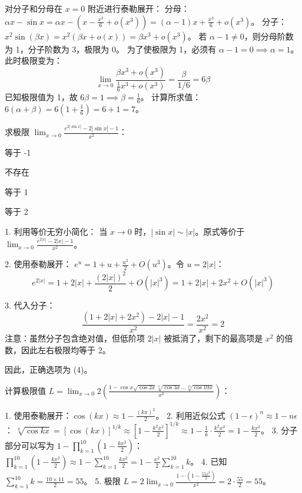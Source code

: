 \begin{questions}
\begin{solution}
对分子和分母在 $x=0$ 附近进行泰勒展开：
分母：$\alpha x - \sin x = \alpha x - (x - \frac{x^3}{6} + o(x^3)) = (\alpha - 1)x + \frac{x^3}{6} + o(x^3)$。
分子：$x^2 \sin(\beta x) = x^2 (\beta x + o(x)) = \beta x^3 + o(x^3)$。
若 $\alpha - 1 \neq 0$，则分母阶数为 1，分子阶数为 3，极限为 0。
为了使极限为 1，必须有 $\alpha - 1 = 0 \implies \alpha = 1$。
此时极限变为：
\[
\lim_{x \to 0} \frac{\beta x^3 + o(x^3)}{\frac{1}{6}x^3 + o(x^3)} = \frac{\beta}{1/6} = 6\beta
\]
已知极限值为 1，故 $6\beta = 1 \implies \beta = \frac{1}{6}$。
计算所求值：$6(\alpha + \beta) = 6(1 + \frac{1}{6}) = 6 + 1 = 7$。
\end{solution}
    \question 
求极限 $\lim_{x \to 0} \frac{e^{2|\sin x|} - 2|\sin x| - 1}{x^2}$：
\begin{choices}
    \item 等于 -1
    \item 不存在
    \item 等于 1
    \item 等于 2
\end{choices}

\begin{solution}
1. 利用等价无穷小简化：
当 $x \to 0$ 时，$|\sin x| \sim |x|$。原式等价于 $\lim_{x \to 0} \frac{e^{2|x|} - 2|x| - 1}{x^2}$。

2. 使用泰勒展开：
$e^u = 1 + u + \frac{u^2}{2} + O(u^3)$。令 $u = 2|x|$：
\[ e^{2|x|} = 1 + 2|x| + \frac{(2|x|)^2}{2} + O(|x|^3) = 1 + 2|x| + 2x^2 + O(|x|^3) \]

3. 代入分子：
\[ \frac{(1 + 2|x| + 2x^2) - 2|x| - 1}{x^2} = \frac{2x^2}{x^2} = 2 \]
注意：虽然分子包含绝对值，但低阶项 $2|x|$ 被抵消了，剩下的最高项是 $x^2$ 的倍数，因此左右极限均等于 2。

因此，正确选项为 (4)。
\end{solution}

\question 
计算极限值 $L = \lim_{x \to 0} 2 \left( \frac{1 - \cos x \sqrt{\cos 2x} \sqrt[3]{\cos 3x} \dots \sqrt[10]{\cos 10x}}{x^2} \right)$：

\begin{solution}
1. 使用泰勒展开：$\cos(kx) \approx 1 - \frac{(kx)^2}{2}$。
2. 利用近似公式 $(1 - \epsilon)^n \approx 1 - n\epsilon$：
   $\sqrt[k]{\cos kx} = [\cos(kx)]^{1/k} \approx [1 - \frac{k^2x^2}{2}]^{1/k} \approx 1 - \frac{1}{k} \cdot \frac{k^2x^2}{2} = 1 - \frac{kx^2}{2}$。
3. 分子部分可以写为 $1 - \prod_{k=1}^{10} (1 - \frac{kx^2}{2})$：
   $\prod_{k=1}^{10} (1 - \frac{kx^2}{2}) \approx 1 - \sum_{k=1}^{10} \frac{kx^2}{2} = 1 - \frac{x^2}{2} \sum_{k=1}^{10} k$。
4. 已知 $\sum_{k=1}^{10} k = \frac{10 \times 11}{2} = 55$。
5. 极限 $L = 2 \lim_{x \to 0} \frac{1 - (1 - \frac{55x^2}{2})}{x^2} = 2 \cdot \frac{55}{2} = 55$。


\end{solution}
\end{questions}
